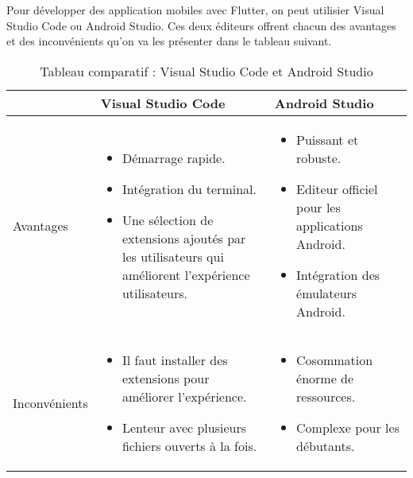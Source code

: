 Pour développer des application mobiles avec Flutter, on peut utilisier Visual Studio Code ou Android Studio. Ces deux éditeurs offrent chacun des avantages et des inconvénients qu'on va les présenter dans le tableau suivant.
\begin{table}[H]
    \begin{center}
        \begin{tabularx}{\textwidth} {
                | >{\centering\arraybackslash}X
                | >{\centering\arraybackslash}X
                | >{\centering\arraybackslash}X |}
            \hline
                          & Visual Studio Code                                                                                       & Android Studio \\
            \hline
            Avantages     & \begin{itemize}
                                \item Démarrage rapide.
                                \item Intégration du terminal.
                                \item Une sélection de extensions ajoutés par les utilisateurs qui améliorent l'expérience utilisateurs.
                            \end{itemize} & \begin{itemize}
                                                \item Puissant et robuste.
                                                \item Editeur officiel pour les applications Android.
                                                \item Intégration des émulateurs Android.
                                            \end{itemize}                   \\
            \hline
            Inconvénients & \begin{itemize}
                                \item Il faut installer des extensions pour améliorer l'expérience.
                                \item Lenteur avec plusieurs fichiers ouverts à la fois.
                            \end{itemize}                                      & \begin{itemize}
                                                                                     \item Cosommation énorme de ressources.
                                                                                     \item Complexe pour les débutants.
                                                                                 \end{itemize}                               \\
            \hline
        \end{tabularx}
        \captionsetup{justification = centering}
        \caption{Tableau comparatif : Visual Studio Code et Android Studio}
        \label{compare_vscode_android_studio}
    \end{center}
\end{table}
